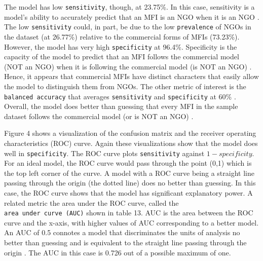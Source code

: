 \documentclass[a4paper,nobind]{templates/ociamthesis}
\begin{document}
The model has low \texttt{sensitivity}, though, at 23.75\%. In this case, sensitivity is a model's ability to accurately predict that an MFI is an NGO when it is an NGO \autocite{marom2010using}. The low \texttt{sensitivity} could, in part, be due to the low \texttt{prevalence} of NGOs in the dataset (at 26.77\%) relative to the commercial forms of MFIs (73.23\%). However, the model has very high \texttt{specificity} at 96.4\%. Specificity is the capacity of the model to predict that an MFI follows the commercial model (NOT an NGO) when it is following the commercial model (is NOT an NGO) \autocite{zeng2020confusion}. Hence, it appears that commercial MFIs have distinct characters that easily allow the model to distinguish them from NGOs. The other metric of interest is the \texttt{balanced\ accuracy} that averages \texttt{sensitivity} and \texttt{specificity} at 60\% \autocite{gorzalczany2016multi}. Overall, the model does better than guessing that every MFI in the sample dataset follows the commercial model (or is NOT an NGO) \autocite{hosmer2013applied}.

Figure 4 shows a visualization of the confusion matrix and the receiver operating characteristics (ROC) curve. Again these visualizations show that the model does well in \texttt{specificity}. The ROC curve plots \texttt{sensitivity} against \(1 - specificity\). For an ideal model, the ROC curve would pass through the point (0,1) which is the top left corner of the curve. A model with a ROC curve being a straight line passing through the origin (the dotted line) does no better than guessing. In this case, the ROC curve shows that the model has significant explanatory power. A related metric the area under the ROC curve, called the \texttt{area\ under\ curve\ (AUC)} shown in table 13. AUC is the area between the ROC curve and the x-axis, with higher values of AUC corresponding to a better model. An AUC of 0.5 connotes a model that discriminates the units of analysis no better than guessing and is equivalent to the straight line passing through the origin \autocite{mandrekar2010receiver}. The AUC in this case is 0.726 out of a possible maximum of one.
\end{document}
